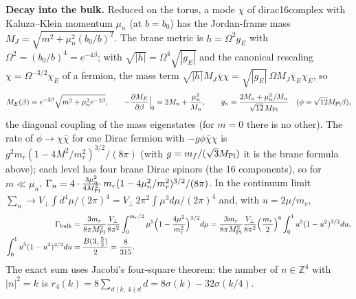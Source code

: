 \documentclass[10pt,a4paper]{article}
\begin{document}
\textbf{Decay into the bulk.} Reduced on the torus, a mode $\chi$ of dirac16complex with Kaluza–Klein momentum $\mu_n$ (at $b=b_0$) has the Jordan-frame mass $M_J=\sqrt{m^2+\mu_n^2(b_0/b)^2}$. The brane metric is $h=\Omega^2g_E$ with $\Omega^2=(b_0/b)^4=e^{-4\beta}$; with $\sqrt{|h|}=\Omega^4\sqrt{|g_E|}$ and the canonical rescaling $\chi=\Omega^{-3/2}\chi_E$ of a fermion, the mass term $\sqrt{|h|}M_J\bar\chi\chi=\sqrt{|g_E|}\,\Omega M_J\bar\chi_E\chi_E$, so
\begin{equation*}
M_E(\beta)=e^{-2\beta}\sqrt{m^2+\mu_n^2e^{-2\beta}},\qquad -\frac{\partial M_E}{\partial\beta}\Big|_0=2M_n+\frac{\mu_n^2}{M_n},\qquad g_n=\frac{2M_n+\mu_n^2/M_n}{\sqrt{12}\,M_{\rm Pl}}\quad(\phi=\sqrt{12}M_{\rm Pl}\beta),
\end{equation*}
the diagonal coupling of the mass eigenstates (for $m=0$ there is no other). The rate of $\phi\to\chi\bar\chi$ for one Dirac fermion with $-g\phi\bar\chi\chi$ is $g^2m_r(1-4M^2/m_r^2)^{3/2}/(8\pi)$ (with $g=m_f/(\sqrt3M_{\rm Pl})$ it is the brane formula above); each level has four brane Dirac spinors (the 16 components), so for $m\ll\mu_n$, $\Gamma_n=4\cdot\frac{3\mu_n^2}{4M_{\rm Pl}^2}\,m_r(1-4\mu_n^2/m_r^2)^{3/2}/(8\pi)$. In the continuum limit $\sum_n\to V_\perp\int d^4\mu/(2\pi)^4=V_\perp\,2\pi^2\int\mu^3d\mu/(2\pi)^4$ and, with $u=2\mu/m_r$,
\begin{align*}
\Gamma_{\rm bulk}&=\frac{3m_r}{8\pi M_{\rm Pl}^2}\frac{V_\perp}{8\pi^2}\int_0^{m_r/2}\mu^5\Big(1-\frac{4\mu^2}{m_r^2}\Big)^{3/2}d\mu=\frac{3m_r}{8\pi M_{\rm Pl}^2}\frac{V_\perp}{8\pi^2}\Big(\frac{m_r}2\Big)^6\int_0^1u^5(1-u^2)^{3/2}du, \\
\int_0^1u^5(1-u^2)^{3/2}du&=\frac{B(3,\frac52)}2=\frac8{315}.
\end{align*}
The exact sum uses Jacobi’s four-square theorem: the number of $n\in\mathbb Z^4$ with $|n|^2=k$ is $r_4(k)=8\sum_{d\mid k,\,4\nmid d}d=8\sigma(k)-32\sigma(k/4)$.
\end{document}

